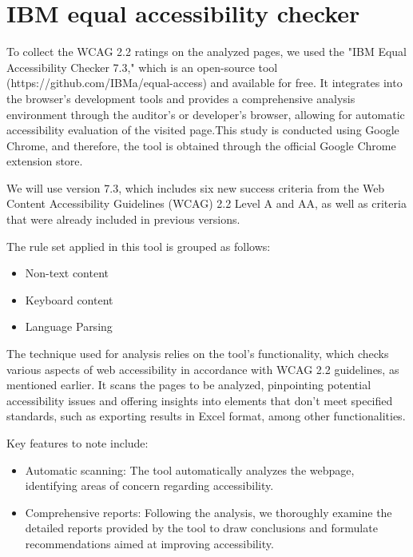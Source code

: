 \documentclass{IEEEtran}
\begin{document}
\section{IBM equal accessibility checker}
To collect the WCAG 2.2 ratings on the analyzed pages, we used the "IBM Equal Accessibility Checker 7.3," which is an open-source tool (https://github.com/IBMa/equal-access) and available for free. It integrates into the browser's development tools and provides a comprehensive analysis environment through the auditor's or developer's browser, allowing for automatic accessibility evaluation of the visited page.This study is conducted using Google Chrome, and therefore, the tool is obtained through the official Google Chrome extension store.\cite{IBMAccessibilityEqualAccessToolkit}

We will use version 7.3, which includes six new success criteria from the Web Content Accessibility Guidelines (WCAG) 2.2 Level A and AA, as well as criteria that were already included in previous versions.

The rule set applied in this tool is grouped as follows:

\begin{itemize}
    \item Non-text content
    \item Keyboard content
    \item Language Parsing
\end{itemize}

The technique used for analysis relies on the tool's functionality, which checks various aspects of web accessibility in accordance with WCAG 2.2 guidelines, as mentioned earlier. It scans the pages to be analyzed, pinpointing potential accessibility issues and offering insights into elements that don't meet specified standards, such as exporting results in Excel format, among other functionalities.

Key features to note include:

\begin{itemize}
    \item Automatic scanning: The tool automatically analyzes the webpage, identifying areas of concern regarding accessibility.
    \item Comprehensive reports: Following the analysis, we thoroughly examine the detailed reports provided by the tool to draw conclusions and formulate recommendations aimed at improving accessibility.
\end{itemize}
\end{document}
